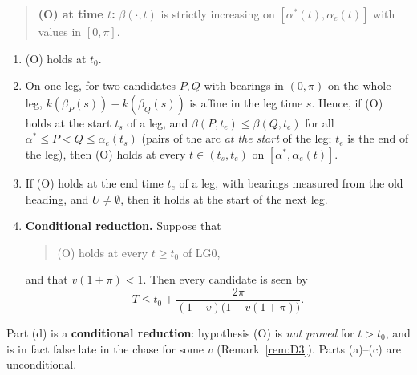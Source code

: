 \begin{quote}
\textbf{(O) at time $t$:} $\beta(\cdot,t)$ is strictly increasing on $[\alpha^*(t),\alpha_e(t)]$ with values in $[0,\pi]$.
\end{quote}

\begin{proposition}\label{prop:D32}
\begin{enumerate}
\item[(a)] \textup{(O)} holds at $t_0$.
\item[(b)] On one leg, for two candidates $P,Q$ with bearings in $(0,\pi)$ on the whole leg, $k(\beta_P(s))-k(\beta_Q(s))$ is affine in
the leg time $s$. Hence, if \textup{(O)} holds at the start $t_s$ of a leg, and $\beta(P,t_e)\le\beta(Q,t_e)$ for all
$\alpha^*\le P<Q\le\alpha_e(t_s)$ \textup{(}pairs of the arc \emph{at the start} of the leg; $t_e$ is the end of the leg\textup{)},
then \textup{(O)} holds at every $t\in(t_s,t_e)$ on $[\alpha^*,\alpha_e(t)]$.
\item[(c)] If \textup{(O)} holds at the end time $t_e$ of a leg, with bearings measured from the old heading, and $U\ne\emptyset$, then it
holds at the start of the next leg.
\item[(d)] \textbf{Conditional reduction.} Suppose that
\begin{quote}
\textup{(O)} holds at every $t\ge t_0$ of LG0,
\end{quote}
and that $v(1+\pi)<1$. Then every candidate is seen by
\[
T\le t_0+\frac{2\pi}{(1-v)\bigl(1-v(1+\pi)\bigr)}.
\]
\end{enumerate}
\end{proposition}

Part (d) is a \textbf{conditional reduction}: hypothesis (O) is \emph{not proved} for $t>t_0$, and is in fact false late in the
chase for some $v$ (Remark~\ref{rem:D3}). Parts (a)--(c) are unconditional.

